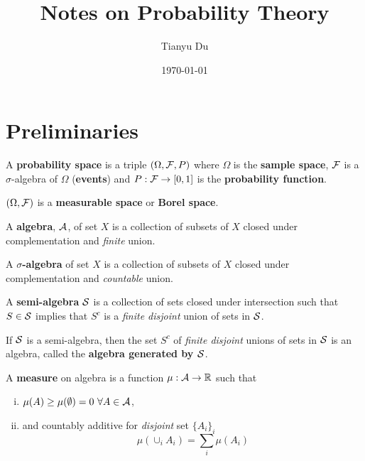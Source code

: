 \documentclass[11pt]{article}
\title{Notes on Probability Theory}
\date{\today}
\author{Tianyu Du}
\begin{document}
	\maketitle
	\tableofcontents
	
	\section{Preliminaries}
		\begin{definition}
			A \textbf{probability space} is a triple $(\Omega, \mathcal{{F}}, P)$ where $\Omega$ is the \textbf{sample space}, $\mathcal{{F}}$ is a $\sigma$-algebra of $\Omega$ (\textbf{events}) and $P: \mathcal{{F}} \to [0,1]$ is the \textbf{probability function}.
		\end{definition}

		\begin{remark}
			$(\Omega, \mathcal{{F}})$ is a \textbf{measurable space} or \textbf{Borel space}.
		\end{remark}
		
		\begin{definition}
			A \textbf{algebra}, $\mathcal{{A}}$, of set $X$ is a collection of subsets of $X$ closed under complementation and \emph{finite} union.
		\end{definition}
		
		\begin{definition}
			A \textbf{$\sigma$-algebra} of set $X$ is a collection of subsets of $X$ closed under complementation and \emph{countable} union.
		\end{definition}
		
		\begin{definition}
			A \textbf{semi-algebra} $\mathcal{{S}}$ is a collection of sets closed under intersection such that $S \in \mathcal{{S}}$ implies that $S^c$ is a \emph{finite disjoint} union of sets in $\mathcal{{S}}$.
		\end{definition}
		
		\begin{lemma}
			If $\mathcal{{S}}$ is a semi-algebra, then the set $S^c$ of \emph{finite disjoint} unions of sets in $\mathcal{{S}}$ is an algebra, called the \textbf{algebra generated by $\mathcal{{S}}$}.
		\end{lemma}
		
		\begin{definition}
			A \textbf{measure} on algebra is a function $\mu: \mathcal{{A}} \to \mathbb{R}$ such that
			\begin{enumerate}[(i)]
				\item $\mu(A) \geq \mu(\emptyset) = 0\ \forall A \in \mc{A}$,
				\item and countably additive for \emph{disjoint} set $\{A_i\}_i$
				\begin{equation}
					\mu(\cup_i A_i) = \sum_i \mu(A_i)
				\end{equation}
			\end{enumerate}
		\end{definition}
		
\end{document}
